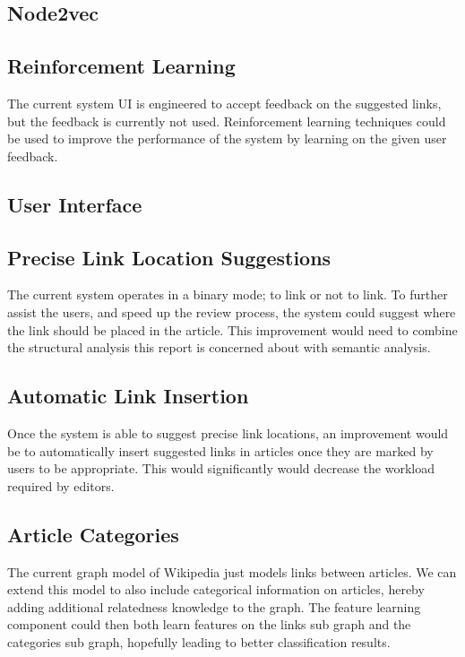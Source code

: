 \subsection{Node2vec}

\subsection{Reinforcement Learning}
The current system UI is engineered to accept feedback on the suggested links, but the feedback is currently not used. Reinforcement learning techniques could be used to improve the performance of the system by learning on the given user feedback.

\subsection{User Interface}

\subsection{Precise Link Location Suggestions}
The current system operates in a binary mode; to link or not to link. To further assist the users, and speed up the review process, the system could suggest where the link should be placed in the article. This improvement would need to combine the structural analysis this report is concerned about with semantic analysis.

\subsection{Automatic Link Insertion}
Once the system is able to suggest precise link locations, an improvement would be to automatically insert suggested links in articles once they are marked by users to be appropriate. This would significantly would decrease the workload required by editors.

\subsection{Article Categories}
The current graph model of Wikipedia just models links between articles. We can extend this model to also include categorical information on articles, hereby adding additional relatedness knowledge to the graph. The feature learning component could then both learn features on the links sub graph and the categories sub graph, hopefully leading to better classification results.
